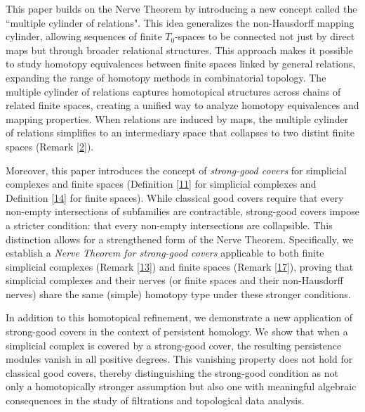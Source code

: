 \documentclass[12pt,a4paper,twoside, reqno, tbtags]{article}
\numberwithin{equation}{section}
\begin{document}
\noindent This paper builds on the Nerve Theorem by introducing a new concept called the ``multiple cylinder of relations". This idea generalizes the non-Hausdorff mapping cylinder, allowing sequences of finite \( T_0 \)-spaces to be connected not just by direct maps but through broader relational structures. This approach makes it possible to study homotopy equivalences between finite spaces linked by general relations, expanding the range of homotopy methods in combinatorial topology. The multiple cylinder of relations captures homotopical structures across chains of related finite spaces, creating a unified way to analyze homotopy equivalences and mapping properties. When relations are induced by maps, the multiple cylinder of relations simplifies to an intermediary space that collapses to two distint finite spaces (Remark \ref{2}).

\noindent Moreover, this paper introduces the concept of \textit{strong-good covers} for simplicial complexes and finite spaces (Definition \ref{11} for simplicial complexes and Definition \ref{14} for finite spaces). While classical good covers require that every non-empty intersections of subfamilies are contractible, strong-good covers impose a stricter condition: that every non-empty intersections are collapsible. This distinction allows for a strengthened form of the Nerve Theorem. Specifically, we establish a \textit{Nerve Theorem for strong-good covers} applicable to both finite simplicial complexes (Remark \ref{13}) and finite spaces (Remark \ref{17}), proving that simplicial complexes and their nerves (or finite spaces and their non-Hausdorff nerves) share the same (simple) homotopy type under these stronger conditions.

\noindent In addition to this homotopical refinement, we demonstrate a new application of strong-good covers in the context of persistent homology. We show that when a simplicial complex is covered by a strong-good cover, the resulting persistence modules vanish in all positive degrees. This vanishing property does not hold for classical good covers, thereby distinguishing the strong-good condition as not only a homotopically stronger assumption but also one with meaningful algebraic consequences in the study of filtrations and topological data analysis.
\end{document}

